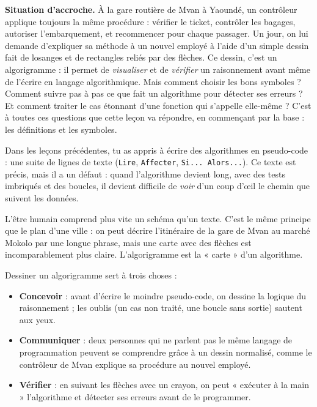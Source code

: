 \documentclass[11pt]{article}
\newcommand{\cle}[1]{{\popxbold\color{popdark}#1}}
\newcounter{popsec}
\newcounter{popsub}
\newcommand{\courssub}[1]{%
  \stepcounter{popsub}%
  \par\vspace{9pt}\noindent{\popxbold\fontsize{11.5}{13}\selectfont\color{popink}{\color{poporange}\thepopsec.\thepopsub}\hspace{6pt}#1}\par\nopagebreak\vspace{4pt}
}
\begin{document}
\textbf{Situation d'accroche.} À la gare routière de Mvan à Yaoundé, un contrôleur applique toujours la même procédure : vérifier le ticket, contrôler les bagages, autoriser l'embarquement, et recommencer pour chaque passager. Un jour, on lui demande d'expliquer sa méthode à un nouvel employé à l'aide d'un simple dessin fait de losanges et de rectangles reliés par des flèches. Ce dessin, c'est un \cle{algorigramme} : il permet de \emph{visualiser} et de \emph{vérifier} un raisonnement avant même de l'écrire en langage algorithmique. Mais comment choisir les bons symboles ? Comment suivre pas à pas ce que fait un algorithme pour détecter ses erreurs ? Et comment traiter le cas étonnant d'une fonction qui s'appelle elle-même ? C'est à toutes ces questions que cette leçon va répondre, en commençant par la base : les définitions et les symboles.

\courssub{Pourquoi dessiner un algorithme ?}

Dans les leçons précédentes, tu as appris à écrire des algorithmes en pseudo-code : une suite de lignes de texte (\texttt{Lire}, \texttt{Affecter}, \texttt{Si... Alors...}). Ce texte est précis, mais il a un défaut : quand l'algorithme devient long, avec des tests imbriqués et des boucles, il devient difficile de \emph{voir} d'un coup d'œil le chemin que suivent les données.

L'être humain comprend plus vite un schéma qu'un texte. C'est le même principe que le plan d'une ville : on peut décrire l'itinéraire de la gare de Mvan au marché Mokolo par une longue phrase, mais une carte avec des flèches est incomparablement plus claire. L'algorigramme est la « carte » d'un algorithme.

Dessiner un algorigramme sert à trois choses :
\begin{itemize}
\item \textbf{Concevoir} : avant d'écrire le moindre pseudo-code, on dessine la logique du raisonnement ; les oublis (un cas non traité, une boucle sans sortie) sautent aux yeux.
\item \textbf{Communiquer} : deux personnes qui ne parlent pas le même langage de programmation peuvent se comprendre grâce à un dessin normalisé, comme le contrôleur de Mvan explique sa procédure au nouvel employé.
\item \textbf{Vérifier} : en suivant les flèches avec un crayon, on peut « exécuter à la main » l'algorithme et détecter ses erreurs avant de le programmer.
\end{itemize}
\end{document}
